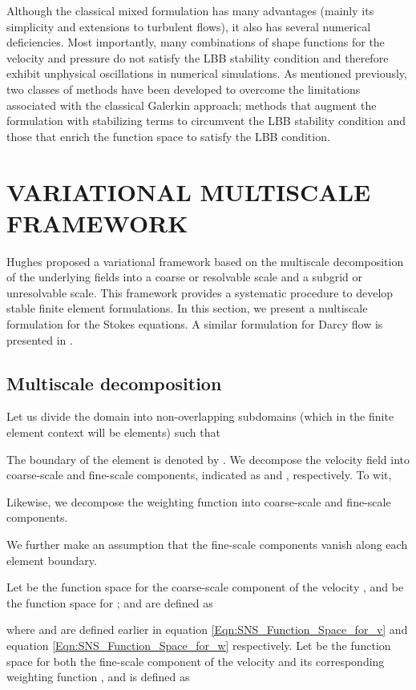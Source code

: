 \documentclass[11pt]{amsart}
\begin{document}
Although the classical mixed formulation has many advantages (mainly its simplicity and extensions to turbulent flows), it also has several numerical 
deficiencies.  Most importantly, many combinations of shape functions for the 
velocity and pressure do not satisfy the LBB 
stability condition and therefore exhibit unphysical oscillations in numerical simulations. 
As mentioned previously, two classes of methods have been developed to overcome the
limitations associated with the classical Galerkin approach; methods that augment the formulation with stabilizing terms to circumvent the LBB stability condition and those that enrich the function space to satisfy the LBB condition. \section{VARIATIONAL MULTISCALE FRAMEWORK}
Hughes \cite{Hughes2} proposed a variational framework based on the 
multiscale decomposition of the underlying fields into a coarse or resolvable scale and a subgrid or unresolvable scale. This framework provides a systematic 
procedure to develop stable finite element formulations. In this section, we 
present a multiscale formulation for the Stokes 
equations. A similar formulation for Darcy flow is presented in \cite{Nakshatrala2}.
\subsection{Multiscale decomposition}
Let us divide the domain  into  non-overlapping subdomains 
 (which in the finite element context will be elements) such 
that

The boundary of the element  is denoted by . We 
decompose the velocity field  into 
coarse-scale and fine-scale components, indicated as  and , respectively. 
To wit, 

Likewise, we decompose the weighting function  
into coarse-scale  and fine-scale 
 components.

We further make an assumption that the fine-scale 
components vanish along each element boundary.

Let  be the function space for the coarse-scale component 
of the velocity , and  be the 
function space for ; and are defined as 

where  and  are defined earlier in equation 
\eqref{Eqn:SNS_Function_Space_for_v} and equation \eqref{Eqn:SNS_Function_Space_for_w} 
respectively. Let  be the function space for both the fine-scale 
component of the velocity  and its corresponding weighting 
function , and is defined as 
\end{document}
